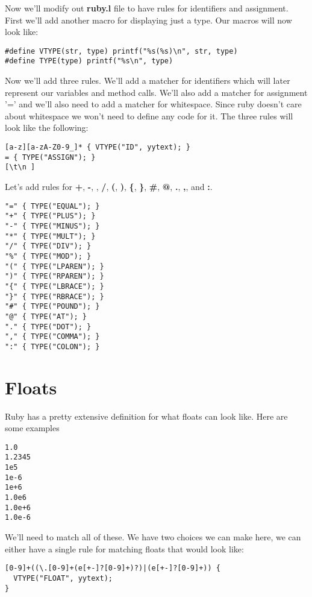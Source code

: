 {Now we'll modify out {\bf ruby.l} file to have rules for identifiers and assignment. First we'll add another macro for displaying just a type. Our macros will now look like:

\begin{lstlisting}
#define VTYPE(str, type) printf("%s(%s)\n", str, type)
#define TYPE(type) printf("%s\n", type)
\end{lstlisting}

Now we'll add three rules. We'll add a matcher for identifiers which will later represent our variables and method calls. We'll also add a matcher for assignment '=' and we'll also need to add a matcher for whitespace. Since ruby doesn't care about whitespace we won't need to define any code for it. The three rules will look like the following:

\begin{lstlisting}
[a-z][a-zA-Z0-9_]* { VTYPE("ID", yytext); }
= { TYPE("ASSIGN"); }
[\t\n ]
\end{lstlisting}

Let's add rules for {\bf +}, {\bf -}, {\bf *}, {\bf /}, {\bf (}, {\bf )}, {\bf \{}, {\bf \}}, {\bf \#}, {\bf @}, {\bf .}, {\bf ,}, and {\bf :}.

\begin{lstlisting}
"=" { TYPE("EQUAL"); }
"+" { TYPE("PLUS"); }
"-" { TYPE("MINUS"); }
"*" { TYPE("MULT"); }
"/" { TYPE("DIV"); }
"%" { TYPE("MOD"); }
"(" { TYPE("LPAREN"); }
")" { TYPE("RPAREN"); }
"{" { TYPE("LBRACE"); }
"}" { TYPE("RBRACE"); }
"#" { TYPE("POUND"); }
"@" { TYPE("AT"); }
"." { TYPE("DOT"); }
"," { TYPE("COMMA"); }
":" { TYPE("COLON"); }
\end{lstlisting}

\section{Floats}

Ruby has a pretty extensive definition for what floats can look like. Here are some examples

\begin{lstlisting}
1.0
1.2345
1e5
1e-6
1e+6
1.0e6
1.0e+6
1.0e-6
\end{lstlisting}

We'll need to match all of these. We have two choices we can make here, we can either have a single rule for matching floats that would look like:

\begin{lstlisting}
[0-9]+((\.[0-9]+(e[+-]?[0-9]+)?)|(e[+-]?[0-9]+)) {
  VTYPE("FLOAT", yytext);
}
\end{lstlisting}

}
